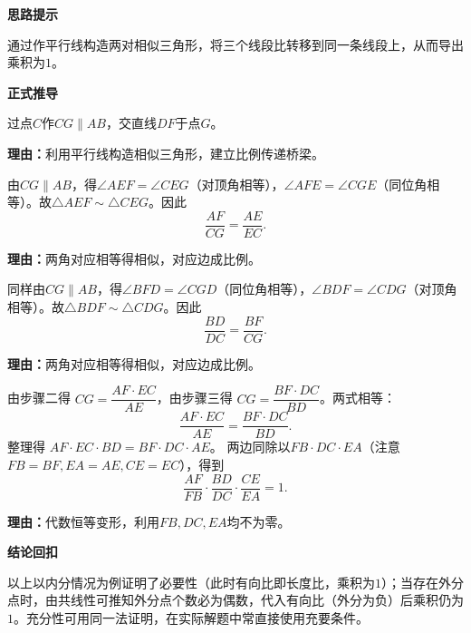 \begin{proofbox}
	\textbf{\textcolor{CProof}{思路提示}}

	通过作平行线构造两对相似三角形，将三个线段比转移到同一条线段上，从而导出乘积为$1$。

	\medskip
	\textbf{\textcolor{CProof}{正式推导}}
	\begin{description}[style=nextline, leftmargin=2.8em, labelsep=0.5em, itemsep=0.55em]
		\item[\textbf{步骤一（作平行线）：}] 过点$C$作$CG\parallel AB$，交直线$DF$于点$G$。
			\par\textbf{理由：}利用平行线构造相似三角形，建立比例传递桥梁。
		\item[\textbf{步骤二（相似三角形①）：}] 由$CG\parallel AB$，得$\angle AEF=\angle CEG$（对顶角相等），$\angle AFE=\angle CGE$（同位角相等）。故$\triangle AEF\sim\triangle CEG$。因此
			\[
				\frac{AF}{CG}=\frac{AE}{EC}.
			\]
			\par\textbf{理由：}两角对应相等得相似，对应边成比例。
		\item[\textbf{步骤三（相似三角形②）：}] 同样由$CG\parallel AB$，得$\angle BFD=\angle CGD$（同位角相等），$\angle BDF=\angle CDG$（对顶角相等）。故$\triangle BDF\sim\triangle CDG$。因此
			\[
				\frac{BD}{DC}=\frac{BF}{CG}.
			\]
			\par\textbf{理由：}两角对应相等得相似，对应边成比例。
		\item[\textbf{步骤四（消去$CG$导出乘积）：}] 由步骤二得 $CG=\dfrac{AF\cdot EC}{AE}$，由步骤三得 $CG=\dfrac{BF\cdot DC}{BD}$。两式相等：
			\[
				\frac{AF\cdot EC}{AE}=\frac{BF\cdot DC}{BD}.
			\]
			整理得 $AF\cdot EC\cdot BD=BF\cdot DC\cdot AE$。
			两边同除以$FB\cdot DC\cdot EA$（注意$FB=BF,EA=AE,CE=EC$），得到
			\[
				\frac{AF}{FB}\cdot\frac{BD}{DC}\cdot\frac{CE}{EA}=1.
			\]
			\par\textbf{理由：}代数恒等变形，利用$FB,DC,EA$均不为零。
	\end{description}

	\medskip
	\textbf{\textcolor{CProof}{结论回扣}}

	以上以内分情况为例证明了必要性（此时有向比即长度比，乘积为$1$）；当存在外分点时，由共线性可推知外分点个数必为偶数，代入有向比（外分为负）后乘积仍为$1$。充分性可用同一法证明，在实际解题中常直接使用充要条件。
\end{proofbox}

